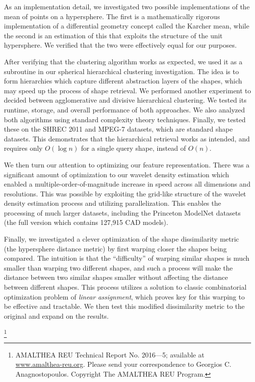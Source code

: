\documentclass[../tech_report_1.tex]{subfiles}
\newcommand\blfootnote[1]{%
  \begingroup
  \renewcommand\thefootnote{}\footnote{#1}%
  \addtocounter{footnote}{-1}%
  \endgroup
}
\begin{document}
As an implementation detail, we investigated two possible implementations of the mean of points on a hypersphere. The first is a mathematically rigorous implementation of a differential geometry concept called the Karcher mean, while the second is an estimation of this that exploits the structure of the unit hypersphere. We verified that the two were effectively equal for our purposes.

After verifying that the clustering algorithm works as expected, we used it as a subroutine in our spherical hierarchical clustering investigation. The idea is to form hierarchies which capture different abstraction layers of the shapes, which may speed up the process of shape retrieval. We performed another experiment to decided between agglomerative and divisive hierarchical clustering. We tested its runtime, storage, and overall performance of both approaches. We also analyzed both algorithms using standard complexity theory techniques. Finally, we tested these on the SHREC 2011\cite{boyer2011shrec} and MPEG-7\cite{bober2001mpeg} datasets, which are standard shape datasets. This demonstrates that the hierarchical retrieval works as intended, and requires only $O(\log n)$ for a single query shape, instead of $O(n)$.

We then turn our attention to optimizing our feature representation. There was a significant amount of optimization to our wavelet density estimation which enabled a multiple-order-of-magnitude increase in speed across all dimensions and resolutions. This was possible by exploiting the grid-like structure of the wavelet density estimation process and utilizing parallelization. This enables the processing of much larger datasets, including the Princeton ModelNet datasets (the full version which contains 127,915 CAD models).

Finally, we investigated a clever optimization of the shape dissimilarity metric (the hypersphere distance metric) by first warping closer the shapes being compared. The intuition is that the ``difficulty'' of warping similar shapes is much smaller than warping two different shapes, and such a process will make the distance between two similar shapes smaller without affecting the distance between different shapes. This process utilizes a solution to classic combinatorial optimization problem of \textit{linear assignment}, which proves key for this warping to be effective and tractable. We then test this modified dissimilarity metric to the original and expand on the results.

\blfootnote{AMALTHEA REU Technical Report No. 2016–--5; available at \href{www.amalthea-reu.org}{www.amalthea-reu.org}. Please send your correspondence to Georgios C. Anagnostopoulos. Copyright \textcopyright \thickspace 2016 The AMALTHEA REU Program.}
\end{document}
